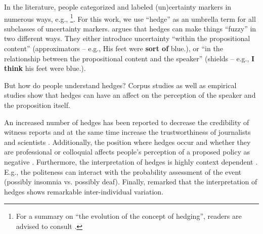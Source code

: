 \documentclass[11pt,a4paper]{article}
\begin{document}
In the literature, people categorized and labeled (un)certainty markers in numerous ways, e.g., \citep{lakoff1972hedges, prince1982hedging, brown1987politeness}\footnote{For a summary on ``the evolution of the concept of hedging'', readers are advised to consult \cite{fraser2010pragmatic}.}. 
For this work, we use ``hedge'' as an umbrella term for all subclasses of uncertainty markers.
\citeauthor{prince1982hedging} argues that hedges can make things ``fuzzy'' \citep{lakoff1972hedges} in two different ways. They either introduce uncertainty ``within the propositional content'' (approximators -- e.g., His feet were \textbf{sort of} blue.), or ``in the relationship between the propositional content and the speaker'' (shields -- e.g., \textbf{I think} his feet were blue.).

But how do people understand hedges? Corpus studies as well as empirical studies show that hedges can have an affect on the perception of the speaker and the proposition itself. 

An increased number of hedges has been reported to decrease the credibility of witness reports \citep{Erickson-etal:1978} and at the same time increase the trustworthiness of journalists and scientists \citep{jensen2008scientific}.
Additionally, the position where hedges occur and whether they are professional or colloquial affects people's perception of a proposed policy as negative \citep{durik2008effects}. Furthermore, the interpretation of hedges is highly context dependent \citeauthor{bonnefon2006tactful,ferson2015natural}. E.g., the politeness can interact with the probability assessment of the event (possibly insomnia vs. possibly deaf).
Finally, \citeauthor{rubin:2007:ShortPapers,ferson2015natural} remarked that the interpretation of hedges shows remarkable inter-individual variation.
\end{document}
